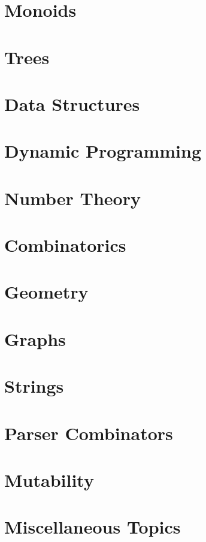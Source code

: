 \documentclass{book}
\begin{document}
\chapter{Monoids}
\label{chap:monoids}

\chapter{Trees}
\label{chap:trees}

\chapter{Data Structures}
\label{chap:data-structures}

\chapter{Dynamic Programming}
\label{chap:dp}

\chapter{Number Theory}
\label{chap:number-theory}

\chapter{Combinatorics}
\label{chap:combinatorics}

\chapter{Geometry}
\label{chap:geometry}

\chapter{Graphs}
\label{chap:graphs}

\chapter{Strings}
\label{chap:strings}

\chapter{Parser Combinators}
\label{chap:parser-comb}

\chapter{Mutability}
\label{chap:mutability}

\chapter{Miscellaneous Topics}
\label{chap:misc}

\printbibliography
\end{document}

